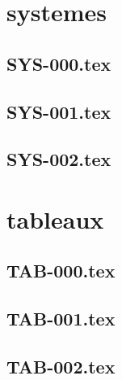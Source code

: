 \subsection*{\xxexo} 
\graphicspath{{../../exos/sql/SQL-003/}}
 
 
\section*{systemes}
\renewcommand{\xxexo}{SYS-000.tex} 
\subsection*{\xxexo} 
\graphicspath{{../../exos/systemes/SYS-000/}}
 
 
\renewcommand{\xxexo}{SYS-001.tex} 
\subsection*{\xxexo} 
\graphicspath{{../../exos/systemes/SYS-001/}}
 
 
\renewcommand{\xxexo}{SYS-002.tex} 
\subsection*{\xxexo} 
\graphicspath{{../../exos/systemes/SYS-002/}}
 
 
\section*{tableaux}
\renewcommand{\xxexo}{TAB-000.tex} 
\subsection*{\xxexo} 
\graphicspath{{../../exos/tableaux/TAB-000/}}
 
 
\renewcommand{\xxexo}{TAB-001.tex} 
\subsection*{\xxexo} 
\graphicspath{{../../exos/tableaux/TAB-001/}}
 
 
\renewcommand{\xxexo}{TAB-002.tex} 
\subsection*{\xxexo} 
\graphicspath{{../../exos/tableaux/TAB-002/}}
 
 

